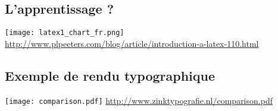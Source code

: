 \subsection{L'apprentissage ?}

\begin{frame}
	\texttt{[image: latex1\_chart\_fr.png]}
	\url{http://www.plpeeters.com/blog/article/introduction-a-latex-110.html}
\end{frame}

\subsection{Exemple de rendu typographique}
\begin{frame}
  \texttt{[image: comparison.pdf]}
  \url{http://www.zinktypografie.nl/comparison.pdf}
\end{frame}
